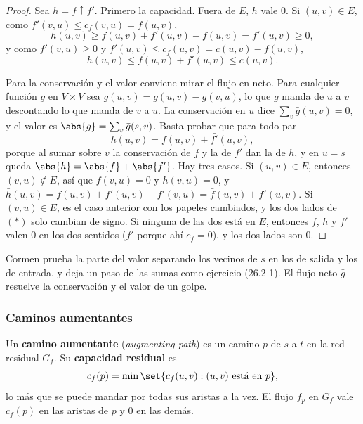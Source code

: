 \documentclass[11pt,letterpaper]{article}
\begin{document}
\begin{proof}
  Sea $h = f \uparrow f'$. Primero la capacidad. Fuera de $E$, $h$
  vale $0$. Si $(u, v) \in E$, como $f'(v, u) \le c_f(v, u) =
  f(u, v)$,
  \[
    h(u, v) \ge f(u, v) + f'(u, v) - f(u, v) = f'(u, v) \ge 0 ,
  \]
  y como $f'(v, u) \ge 0$ y $f'(u, v) \le c_f(u, v) = c(u, v) -
  f(u, v)$,
  \[
    h(u, v) \le f(u, v) + f'(u, v) \le c(u, v) .
  \]

  Para la conservación y el valor conviene mirar el flujo en neto.
  Para cualquier función $g$ en $V \times V$ sea
  $\bar{g}(u, v) = g(u, v) - g(v, u)$, lo que $g$ manda de $u$ a $v$
  descontando lo que manda de $v$ a $u$. La conservación en $u$ dice
  $\sum_{v} \bar{g}(u, v) = 0$, y el valor es
  $\abs{g} = \sum_{v} \bar{g}(s, v)$. Basta probar que para todo par
  \[
    \bar{h}(u, v) = \bar{f}(u, v) + \bar{f'}(u, v) , \tag{$*$}
  \]
  porque al sumar sobre $v$ la conservación de $f$ y la de $f'$ dan la
  de $h$, y en $u = s$ queda $\abs{h} = \abs{f} + \abs{f'}$. Hay tres
  casos. Si $(u, v) \in E$, entonces $(v, u) \notin E$, así que
  $f(v, u) = 0$ y $h(v, u) = 0$, y
  $\bar{h}(u, v) = f(u, v) + f'(u, v) - f'(v, u) = \bar{f}(u, v) +
  \bar{f'}(u, v)$. Si $(v, u) \in E$, es el caso anterior con los
  papeles cambiados, y los dos lados de $(*)$ solo cambian de signo.
  Si ninguna de las dos está en $E$, entonces $f$, $h$ y $f'$ valen
  $0$ en los dos sentidos ($f'$ porque ahí $c_f = 0$), y los dos lados
  son $0$.
\end{proof}

Cormen prueba la parte del valor separando los vecinos de $s$ en los
de salida y los de entrada, y deja un paso de las sumas como ejercicio
(26.2-1). El flujo neto $\bar{g}$ resuelve la conservación y el valor
de un golpe.

\subsubsection*{Caminos aumentantes}

\begin{definicion}
  Un \textbf{camino aumentante} (\textit{augmenting path}) es un
  camino $p$ de $s$ a $t$ en la red residual $G_f$. Su
  \textbf{capacidad residual} es
  \[
    c_f(p) = \min\set{c_f(u, v) : (u, v) \text{ está en } p} ,
  \]
  lo más que se puede mandar por todas sus aristas a la vez. El flujo
  $f_p$ en $G_f$ vale $c_f(p)$ en las aristas de $p$ y $0$ en las
  demás.
\end{definicion}
\end{document}

